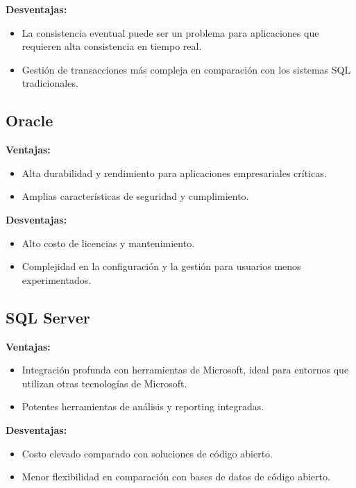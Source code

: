 \documentclass{article}
\begin{document}
\textbf{Desventajas:}
\begin{itemize}
  \item La consistencia eventual puede ser un problema para aplicaciones que requieren alta consistencia en tiempo real.
  \item Gestión de transacciones más compleja en comparación con los sistemas SQL tradicionales.
\end{itemize}

\subsection{Oracle}
\textbf{Ventajas:}
\begin{itemize}
  \item Alta durabilidad y rendimiento para aplicaciones empresariales críticas.
  \item Amplias características de seguridad y cumplimiento.
\end{itemize}

\textbf{Desventajas:}
\begin{itemize}
  \item Alto costo de licencias y mantenimiento.
  \item Complejidad en la configuración y la gestión para usuarios menos experimentados.
\end{itemize}

\subsection{SQL Server}
\textbf{Ventajas:}
\begin{itemize}
  \item Integración profunda con herramientas de Microsoft, ideal para entornos que utilizan otras tecnologías de Microsoft.
  \item Potentes herramientas de análisis y reporting integradas.
\end{itemize}

\textbf{Desventajas:}
\begin{itemize}
  \item Costo elevado comparado con soluciones de código abierto.
  \item Menor flexibilidad en comparación con bases de datos de código abierto.
\end{itemize}
\end{document}
